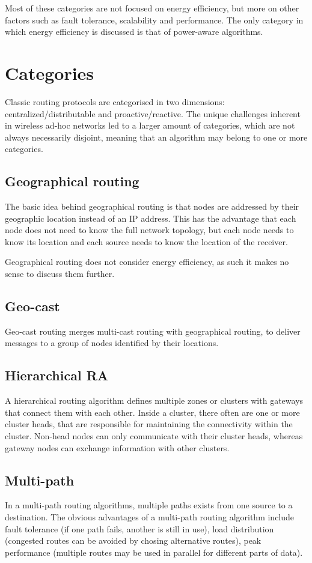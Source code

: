 \documentclass[conference]{IEEEtran}
\begin{document}
Most of these categories are not focused on energy efficiency, but more on
other factors such as fault tolerance, scalability and performance. The only
category in which energy efficiency is discussed is that of power-aware algorithms.


\section{Categories}
Classic routing protocols are categorised in two dimensions:
centralized/distributable and proactive/reactive.
The unique challenges inherent in wireless ad-hoc networks led to a larger
amount of categories, which are not always necessarily disjoint, meaning
that an algorithm may belong to one or more categories.


\subsection{Geographical routing}
The basic idea behind geographical routing is that nodes are addressed by
their geographic location instead of an IP address. This has the advantage
that each node does not need to know the full network topology, but each
node needs to know its location and each source needs to know the location
of the receiver.

Geographical routing does not consider energy efficiency, as such it makes
no sense to discuss them further.

\subsection{Geo-cast}
Geo-cast routing merges multi-cast routing with geographical routing, to
deliver messages to a group of nodes identified by their locations.

\subsection{Hierarchical RA}
A hierarchical routing algorithm defines multiple zones or clusters with
gateways that connect them with each other. Inside a cluster, there often
are one or more cluster heads, that are responsible for maintaining the
connectivity within the cluster. Non-head nodes can only communicate with
their cluster heads, whereas gateway nodes can exchange information with
other clusters.


\subsection{Multi-path}
In a multi-path routing algorithms, multiple paths exists from one source
to a destination. The obvious advantages of a multi-path routing
algorithm include fault tolerance (if one path fails, another is still in
use), load distribution (congested routes can be avoided by chosing alternative
routes), peak performance (multiple routes may be used in parallel for different
parts of data).
\end{document}
